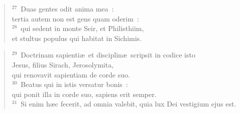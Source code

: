 \begin{verse}${}^{27}$~Duas gentes odit anima mea~:\\ tertia autem non est gens quam oderim~:\\
${}^{28}$~qui sedent in monte Seir, et Philisthiim,\\ et stultus populus qui habitat in Sichimis.\end{verse}


\begin{verse}${}^{29}$~Doctrinam sapienti\ae\ et disciplin\ae\ scripsit in codice isto\\ Jesus, filius Sirach, Jerosolymita,\\ qui renovavit sapientiam de corde suo.\\
${}^{30}$~Beatus qui in istis versatur bonis~:\\ qui ponit illa in corde suo, sapiens erit semper.\\
${}^{31}$~Si enim h\ae c fecerit, ad omnia valebit, quia lux Dei vestigium ejus est.\end{verse}




